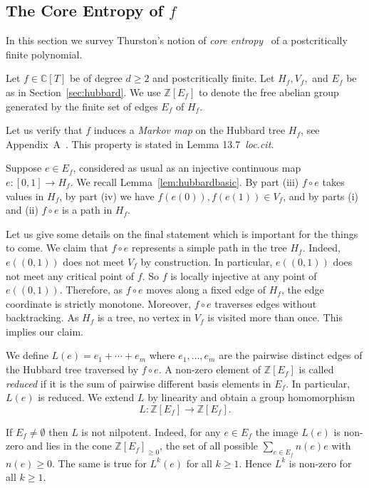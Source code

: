 \documentclass[12pt,oneside,a4]{amsart}
\newcommand{\IC}{\mathbb{C}}
\newcommand{\IZ}{\mathbb{Z}}
\numberwithin{maincounter}{section}
\numberwithin{equation}{section}
\begin{document}
\subsection{The Core Entropy of $f$}
\label{sec:entropy}

In this section we survey Thurston's notion of \textit{core
entropy}~\cite{thurstonetal:degreed} of a postcritically finite
polynomial.

Let $f\in \IC[T]$ be of  degree $d \ge 2$ and
postcritically finite. 
Let $H_f,V_f,$ and $E_f$ be as in
Section~\ref{sec:hubbard}. We use $\IZ[E_f]$ to denote the free abelian group generated by the finite set
of edges $E_f$ of $H_f$. 

Let us verify that $f$ induces a \textit{Markov map} on the Hubbard
tree $H_f$, see Appendix~A~\cite{thurstonetal:degreed}. This property
is stated in Lemma 13.7~\textit{loc.cit.}

Suppose $e\in E_f$, considered as usual as an injective continuous map
$e\colon [0,1]\rightarrow H_f$.
We recall
Lemma~\ref{lem:hubbardbasic}.
By part (iii) $f\circ e$ takes values in $H_f$,
by part (iv) we have $f(e(0)),f(e(1)) \in V_f$, and
by parts (i) and (ii)
$f\circ e$ is a path in $H_f$. 

Let us give some details on the final statement which is important for
the things to come.
We claim that $f\circ e$ represents a simple path in the tree $H_f$.
Indeed, $e((0,1))$ does not meet $V_f$ by construction. In particular,
$e((0,1))$  does
not meet any critical point of $f$. So $f$ is locally injective at any
point of $e((0,1))$. Therefore, as $f\circ e$ moves along a fixed edge
of $H_f$, the edge coordinate is strictly monotone. Moreover, $f\circ e$
traverses edges without backtracking. As $H_f$ is a tree, no vertex in
$V_f$ is visited more than once. This implies our claim.

We define $L(e) = e_1+\cdots + e_m$
where $e_1,\ldots,e_m$ are the pairwise distinct edges of the Hubbard
tree 
traversed by
$f\circ e$.
A non-zero element of $\IZ[E_f]$ is called
\textit{reduced} if it is the sum of pairwise different basis elements
in $E_f$.
In particular, $L(e)$ is reduced.
We extend $L$ by linearity and obtain a group homomorphism
\begin{equation}
  \label{def:L}
  L \colon \IZ[E_f] \rightarrow \IZ[E_f].
\end{equation}

If $E_f\not=\emptyset$ then $L$ is not nilpotent. Indeed, for any
$e\in E_f$ the image $L(e)$  is non-zero and
lies in the cone $\IZ[E_f]_{\ge 0}$, the set of all possible
$\sum_{e\in E_f} n(e)e$ with $n(e)\ge 0$. 
The same is true for $L^k(e)$ for all $k\ge 1$. Hence $L^k$ is non-zero for
all $k\ge 1$.
\end{document}
